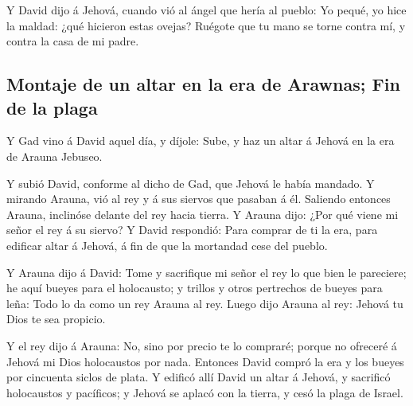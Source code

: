  Y David dijo á Jehová, cuando vió al ángel que hería al
pueblo: Yo pequé, yo hice la maldad: ¿qué hicieron estas ovejas? Ruégote
que tu mano se torne contra mí, y contra la casa de mi padre.

\hypertarget{montaje-de-un-altar-en-la-era-de-arawnas-fin-de-la-plaga}{%
\subsection{Montaje de un altar en la era de Arawnas; Fin de la
plaga}\label{montaje-de-un-altar-en-la-era-de-arawnas-fin-de-la-plaga}}

 Y Gad vino á David aquel día, y díjole: Sube, y haz un
altar á Jehová en la era de Arauna Jebuseo.

 Y subió David, conforme al dicho de Gad, que Jehová le
había mandado.  Y mirando Arauna, vió al rey y á sus
siervos que pasaban á él. Saliendo entonces Arauna, inclinóse delante
del rey hacia tierra.  Y Arauna dijo: ¿Por qué viene mi
señor el rey á su siervo? Y David respondió: Para comprar de ti la era,
para edificar altar á Jehová, á fin de que la mortandad cese del pueblo.

 Y Arauna dijo á David: Tome y sacrifique mi señor el rey
lo que bien le pareciere; he aquí bueyes para el holocausto; y trillos y
otros pertrechos de bueyes para leña:  Todo lo da como un
rey Arauna al rey. Luego dijo Arauna al rey: Jehová tu Dios te sea
propicio.

 Y el rey dijo á Arauna: No, sino por precio te lo
compraré; porque no ofreceré á Jehová mi Dios holocaustos por nada.
Entonces David compró la era y los bueyes por cincuenta siclos de plata.
 Y edificó allí David un altar á Jehová, y sacrificó
holocaustos y pacíficos; y Jehová se aplacó con la tierra, y cesó la
plaga de Israel.
